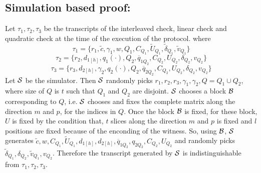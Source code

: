 \subsection{Simulation based proof:} Let $\tau_1, \tau_2, \tau_3$ be the transcripts of the interleaved check, linear check and quadratic check at the time of the execution of the protocol. where 
$$\tau_1=\{r_1,\tilde{c}, \gamma_1, w, Q_1, C_{Q_1}, \widetilde{U}_{Q_1}, \tilde{\delta}_{Q_1}, \tilde{v}_{Q_1}\}$$
$$\tau_2= \{r_2, d_{1[h]}, q_1(\cdot), Q_2, \overline{q}_{1Q_2}, C_{Q_2}, U_{Q_2}, \delta_{Q_2}, v_{Q_2} \}$$
$$\tau_3= \{r_3, d_{2[h]}, \gamma_2, q_2(\cdot), Q_2, \overline{q}_{2Q_2}, C_{Q_2}, U_{Q_2}, \delta_{Q_2}, v_{Q_2} \}$$
Let ${\cal S}$ be the simulator. Then ${\cal S}$ randomly picks $r_1, r_2, r_3, \gamma_1, \gamma_2, Q=Q_1\cup Q_2$, where size of $Q$ is $t$ such that $Q_1$ and $Q_2$ are disjoint. ${\cal S}$ chooses a block ${\cal B}$ corresponding to $Q$, i.e. ${\cal S}$ chooses and fixes the complete matrix along the direction $m$ and $p$, for the indices in $Q$. Once the block ${\cal B}$ is fixed, for these block, $U$ is fixed by the condition that, $t$ slices along the direction $m$ and $p$ is fixed and $l$ positions are fixed because of the enconding of the witness. So, using ${\cal B}$, ${\cal S}$ generates $\tilde{c}, w, C_{Q_1}, \widetilde{U}_{Q_1}, d_{1[h]}, d_{2[h]}, \overline{q}_{1Q_2}, q_{2Q_2}, C_{Q_2}, U_{Q_2}$ and randomly picks $\tilde{\delta}_{Q_1},\delta_{Q_2}, \tilde{v}_{Q_1}, v_{Q_2}$. Therefore the transcript generated by ${\cal S}$ is indistinguishable from $\tau_1, \tau_2, \tau_3$. 


